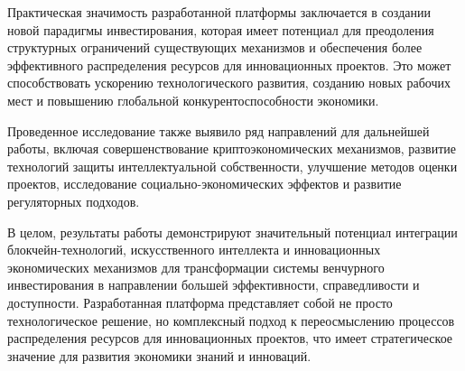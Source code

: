 \documentclass[
    14pt,
    specialist,
    candidate, %
    subf, %
    href,
    dotsinheaders=false
]{disser}
\begin{document}
Практическая значимость разработанной платформы заключается в создании новой парадигмы инвестирования, которая имеет потенциал для преодоления структурных ограничений существующих механизмов и обеспечения более эффективного распределения ресурсов для инновационных проектов. Это может способствовать ускорению технологического развития, созданию новых рабочих мест и повышению глобальной конкурентоспособности экономики.

Проведенное исследование также выявило ряд направлений для дальнейшей работы, включая совершенствование криптоэкономических механизмов, развитие технологий защиты интеллектуальной собственности, улучшение методов оценки проектов, исследование социально-экономических эффектов и развитие регуляторных подходов.

В целом, результаты работы демонстрируют значительный потенциал интеграции блокчейн-технологий, искусственного интеллекта и инновационных экономических механизмов для трансформации системы венчурного инвестирования в направлении большей эффективности, справедливости и доступности. Разработанная платформа представляет собой не просто технологическое решение, но комплексный подход к переосмыслению процессов распределения ресурсов для инновационных проектов, что имеет стратегическое значение для развития экономики знаний и инноваций.

\renewcommand{\bibname}{\fontsize{14pt}{21pt}\selectfont СПИСОК ИСПОЛЬЗОВАННЫХ ИСТОЧНИКОВ}


\end{document}
